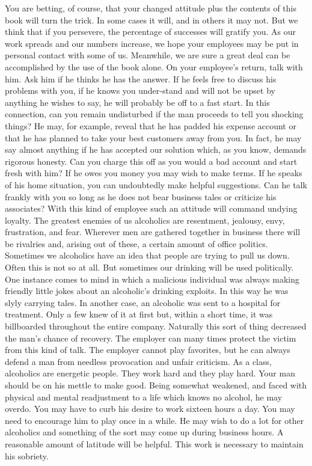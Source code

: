 \begin{biblechapter}
You are betting, of course, that your changed attitude plus the contents of this book will turn the trick.  In some cases it will, and in others it may not.  But we think that if you persevere, the percentage of successes will gratify you.  As our work spreads and our numbers increase, we hope your employees may be put in personal contact with some of us.  Meanwhile, we are sure a great deal can be accomplished by the use of the book alone.
On your employee's return, talk with him.  Ask him if he thinks he has the answer.  If he feels free to discuss his problems with you, if he knows you under-stand and will not be upset by anything he wishes to say, he will probably be off to a fast start.
In this connection, can you remain undisturbed if the man proceeds to tell you shocking things?  He may, for example, reveal that he has padded his expense account or that he has planned to take your best customers away from you.  In fact, he may say almost anything if he has accepted our solution which, as you know, demands rigorous honesty.  Can you charge this off as you would a bad account and start fresh with him?  If he owes you money you may wish to make terms.
If he speaks of his home situation, you can undoubtedly make helpful suggestions.  Can he talk frankly with you so long as he does not bear business tales or criticize his associates?  With this kind of employee such an attitude will command undying loyalty.
The greatest enemies of us alcoholics are resentment, jealousy, envy, frustration, and fear.  Wherever men are gathered together in business there will be rivalries and, arising out of these, a certain amount of office politics.  Sometimes we alcoholics have an idea that people are trying to pull us down.  Often this is not so at all.  But sometimes our drinking will be used politically.
One instance comes to mind in which a malicious individual was always making friendly little jokes about an alcoholic's drinking exploits.  In this way he was slyly carrying tales.  In another case, an alcoholic was sent to a hospital for treatment.  Only a few knew of it at first but, within a short time, it was billboarded throughout the entire company.  Naturally this sort of thing decreased the man's chance of recovery.  The employer can many times protect the victim from this kind of talk.  The employer cannot play favorites, but he can always defend a man from needless provocation and unfair criticism.
As a class, alcoholics are energetic people.  They work hard and they play hard.  Your man should be on his mettle to make good.  Being somewhat weakened, and faced with physical and mental readjustment to a life which knows no alcohol, he may overdo.  You may have to curb his desire to work sixteen hours a day.  You may need to encourage him to play once in a while.  He may wish to do a lot for other alcoholics and something of the sort may come up during business hours.  A reasonable amount of latitude will be helpful.  This work is necessary to maintain his sobriety.

\end{biblechapter}
